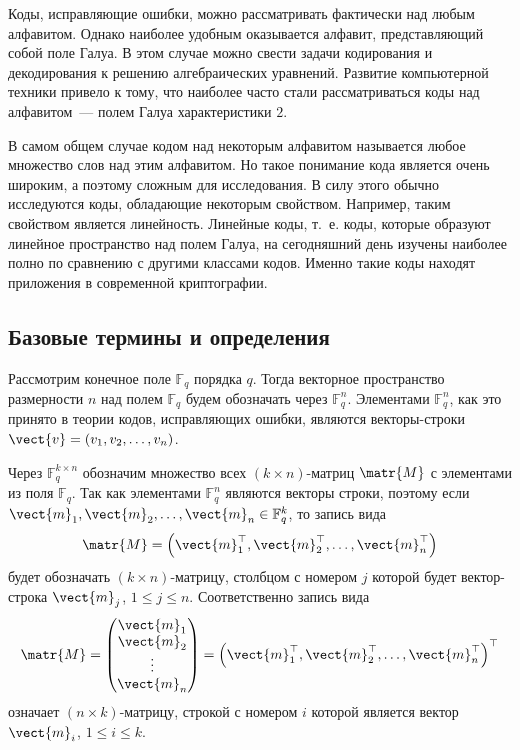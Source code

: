 \documentclass[14pt]{cmcmsuthesis-bachelor}
\begin{document}
Коды, исправляющие ошибки, можно рассматривать фактически над любым алфавитом.
Однако наиболее удобным оказывается алфавит, представляющий собой поле Галуа.
В этом случае можно свести задачи кодирования и декодирования к решению алгебраических уравнений.
Развитие компьютерной техники привело к тому, что наиболее часто стали рассматриваться коды над алфавитом~--- полем Галуа характеристики \(2\).

В самом общем случае кодом над некоторым алфавитом называется любое множество слов над этим алфавитом.
Но такое понимание кода является очень широким, а поэтому сложным для исследования.
В силу этого обычно исследуются коды, обладающие некоторым свойством.
Например, таким свойством является линейность.
Линейные коды, т.~е. коды, которые образуют линейное пространство над полем Галуа, на сегодняшний день изучены наиболее полно по сравнению с другими классами кодов.
Именно такие коды находят приложения в современной криптографии.
\subsection{Базовые термины и определения}
\label{sec:orgd7e721a}
Рассмотрим конечное поле \(\mathbb{F}_q\) порядка \(q\).
Тогда векторное пространство размерности \(n\) над полем \(\mathbb{F}_q\) будем обозначать через \(\mathbb{F}^n_q\).
Элементами \(\mathbb{F}^{n}_{q}\), как это принято в теории кодов, исправляющих ошибки, являются векторы-строки \(\vect{v} = \left(v_{1}, v_{2}, \dotsc, v_{n}\right)\).

Через \(\mathbb{F}^{k \times n}_{q}\) обозначим множество всех \((k \times n)\)-матриц \(\matr{M}\) с элементами из поля \(\mathbb{F}_{q}\).
Так как элементами \(\mathbb{F}^{n}_{q}\) являются векторы строки, поэтому если \(\vect{m}_1, \vect{m}_2, \dotsc ,\vect{m}_{n}\in \mathbb{F}^{k}_{q}\), то запись вида
\[ \matr{M}=\left(\vect{m}^{\top}_{1}, \vect{m}^{\top}_{2}, \dotsc, \vect{m}^{\top}_{n}\right) \]
будет обозначать \((k \times n)\)-матрицу, столбцом с номером \(j\) которой будет вектор-строка \(\vect{m}_j\), \(1\le j\le n\).
Соответственно запись вида
\[ \matr{M}= \begin{pmatrix}
             \vect{m}_{1}\\
             \vect{m}_{2}\\
             \vdots\\
             \vect{m}_{n}
             \end{pmatrix} = \left(\vect{m}^{\top}_{1}, \vect{m}^{\top}_{2}, \dotsc, \vect{m}^{\top}_{n}\right)^{\top} \]
означает \((n \times k)\)-матрицу, строкой с номером \(i\) которой является вектор \(\vect{m}_i\), \(1\le i\le k\).
\end{document}
